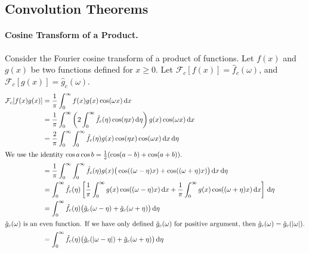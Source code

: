 \subsection{Convolution Theorems}



\paragraph{Cosine Transform of a Product.}
Consider the Fourier cosine transform of a product of functions.
Let $f(x)$ and $g(x)$ be two functions defined for $x \geq 0$.
Let $\mathcal{F}_c[f(x)] = \hat{f}_c(\omega)$, and $\mathcal{F}_c[g(x)] = 
\hat{g}_c(\omega)$.
\begin{align*}
  \mathcal{F}_c[f(x)g(x)]
  &= \frac{1}{\pi} \int_0^\infty f(x) g(x) \cos(\omega x)\,\mathrm{d} x 
  \\
  &= \frac{1}{\pi} \int_0^\infty \left( 2 \int_0^\infty \hat{f}_c(\eta) \cos(\eta x)\,\mathrm{d} \eta \right) 
  g(x) \cos(\omega x)\,\mathrm{d} x 
  \\
  &= \frac{2}{\pi} \int_0^\infty \int_0^\infty \hat{f}_c(\eta) g(x) \cos(\eta x) 
  \cos(\omega x)\,\mathrm{d} x\,\mathrm{d} \eta 
  \\
  \intertext{We use the identity $\cos a \cos b = \frac{1}{2}(\cos(a-b) 
    + \cos(a+b))$.}
  &= \frac{1}{\pi} \int_0^\infty \int_0^\infty \hat{f}_c(\eta) g(x) \big( \cos((\omega-\eta)x)
  + \cos((\omega + \eta) x) \big)\,\mathrm{d} x \,\mathrm{d} \eta 
  \\
  &= \int_0^\infty \hat{f}_c(\eta) \left[ \frac{1}{\pi} \int_0^\infty g(x) 
    \cos((\omega-\eta)x)\,\mathrm{d} x + \frac{1}{\pi} \int_0^\infty g(x) 
    \cos((\omega+\eta)x)\,\mathrm{d} x \right]\,\mathrm{d} \eta 
  \\
  &= \int_0^\infty \hat{f}_c(\eta) \big(\hat{g}_c(\omega-\eta) 
  + \hat{g}_c(\omega+\eta) \big)\,\mathrm{d} \eta 
  \\
  \intertext{$\hat{g}_c(\omega)$ is an even function.  If we have only defined
    $\hat{g}_c(\omega)$ for positive argument, then $\hat{g}_c(\omega) = 
    \hat{g}_c(|\omega|)$.}
  &= \int_0^\infty \hat{f}_c(\eta) \big(\hat{g}_c(|\omega-\eta|) + \hat{g}_c(\omega+\eta) \big)\,\mathrm{d} \eta 
\end{align*}




